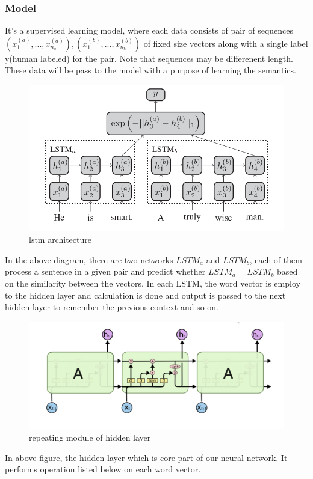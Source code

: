 \subsubsection{Model}
It's a supervised learning model, where each data consists of pair of sequences $(x_1^{(a)},...,x_{n_a}^{(a)}), (x_1^{(b)},...,x_{n_b}^{(b)})$ of fixed size vectors along with a single label y(human labeled) for the pair. Note that sequences may be differenent length. These data will be pass to the model with a purpose of learning the semantics. 
 \begin{figure}[h]
    \centering
    \includegraphics[width=.75\textwidth]{lstm_image}
    \caption{lstm architecture}
\end{figure}
In the above diagram, there are two networks $LSTM_a$ and $LSTM_b$, each of them process a sentence in a given pair and predict whether  $LSTM_a=LSTM_b$ based on the similarity between the vectors. In each LSTM, the word vector is employ to the hidden layer and calculation is done and output is passed to the next hidden layer to remember the previous context and so on.
 \begin{figure}[h]
    \centering
    \includegraphics[width=.85\textwidth]{hidden_layer}
    \caption{repeating module of hidden layer}
\end{figure}
In above figure, the hidden layer which is core part of our neural network. It performs operation listed below on each word vector.
